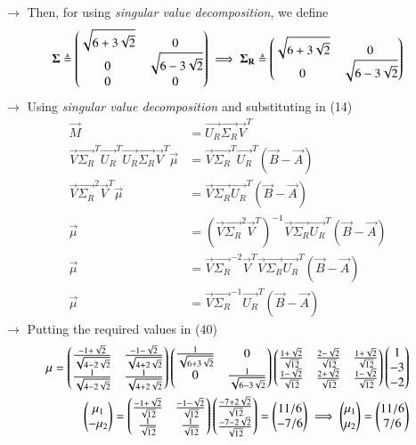 \documentclass[journal]{IEEEtran}
\begin{document}
$\longrightarrow$ Then, for using \textit{singular value decomposition}, we define
\begin{align}
\mathbf{\Sigma} \triangleq \begin{pmatrix}\sqrt{6+3\sqrt{2}}&0\\0&\sqrt{6-3\sqrt{2}}\\0&0\end{pmatrix} \implies
\mathbf{\Sigma_R} \triangleq \begin{pmatrix}\sqrt{6+3\sqrt{2}}&0\\0&\sqrt{6-3\sqrt{2}}\end{pmatrix}
\end{align}
$\rightarrow$ Using \textit{singular value decomposition} and substituting in (14)
\begin{align}
    \vec{M} &= \vec{U_R}\vec{\Sigma_R}\vec{V}^T \\
    \vec{V}\vec{\Sigma_R}^T\vec{U_R}^T\vec{U_R}\vec{\Sigma_R}\vec{V}^T\vec{\mu} &= \vec{V}\vec{\Sigma_R}^T\vec{U_R}^T(\vec{B}-\vec{A}) \\
    \vec{V}\vec{\Sigma_R}^2\vec{V}^T\vec{\mu} &= \vec{V}\vec{\Sigma_R}\vec{U_R}^T(\vec{B}-\vec{A}) \\
    \vec{\mu} &= (\vec{V}\vec{\Sigma_R}^2\vec{V}^T)^{-1}\vec{V}\vec{\Sigma_R}\vec{U_R}^T(\vec{B}-\vec{A}) \\
    \vec{\mu} &= \vec{V}\vec{\Sigma_R}^{-2}\vec{V}^T\vec{V}\vec{\Sigma_R}\vec{U_R}^T(\vec{B}-\vec{A}) \\
    \vec{\mu} &= \vec{V}\vec{\Sigma_R}^{-1}\vec{U_R}^T(\vec{B}-\vec{A})
\end{align}
$\rightarrow$ Putting the required values in (40)
\begin{align}
    \mathbf{\mu} = \begin{pmatrix}\frac{-1+\sqrt{2}}{\sqrt{4-2\sqrt{2}}}&\frac{-1-\sqrt{2}}{\sqrt{4+2\sqrt{2}}} \\ \frac{1}{\sqrt{4-2\sqrt{2}}}&\frac{1}{\sqrt{4+2\sqrt{2}}}\end{pmatrix} \begin{pmatrix}\frac{1}{\sqrt{6+3\sqrt{2}}}&0\\0&\frac{1}{\sqrt{6-3\sqrt{2}}}\end{pmatrix} \begin{pmatrix}\frac{1+\sqrt{2}}{\sqrt{12}}&\frac{2-\sqrt{2}}{\sqrt{12}}&\frac{1+\sqrt{2}}{\sqrt{12}}\\\frac{1-\sqrt{2}}{\sqrt{12}}&\frac{2+\sqrt{2}}{\sqrt{12}}&\frac{1-\sqrt{2}}{\sqrt{12}}\end{pmatrix} \begin{pmatrix}1\\-3\\-2\end{pmatrix} \\
    \begin{pmatrix}\mu_1\\-\mu_2\end{pmatrix} = \begin{pmatrix}\frac{-1+\sqrt{2}}{\sqrt{12}}&\frac{-1-\sqrt{2}}{\sqrt{12}}\\\frac{1}{\sqrt{12}}&\frac{1}{\sqrt{12}}\end{pmatrix} \begin{pmatrix}\frac{-7+2\sqrt{2}}{\sqrt{12}}\\\frac{-7-2\sqrt{2}}{\sqrt{12}}\end{pmatrix} = \begin{pmatrix}11/6\\-7/6\end{pmatrix} \implies \begin{pmatrix}\mu_1\\\mu_2\end{pmatrix} = \begin{pmatrix}11/6\\7/6\end{pmatrix}
\end{align}
\end{document}
